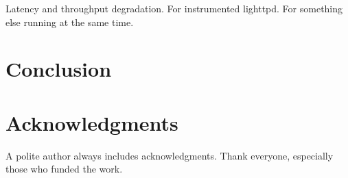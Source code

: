 \documentclass[letterpaper,twocolumn,10pt]{article}
\begin{document}
Latency and throughput degradation.\newline
For instrumented lighttpd. For something else running at the same time.


\section{Conclusion}

\section{Acknowledgments}

A polite author always includes acknowledgments.  Thank everyone,
especially those who funded the work.



{\footnotesize 
}
\end{document}
